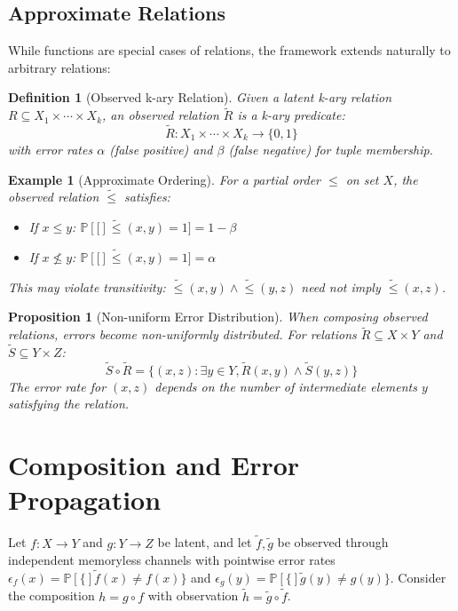 \documentclass[11pt,final,hidelinks]{article}
\newtheorem{proposition}[theorem]{Proposition}
\newtheorem{definition}[theorem]{Definition}
\newtheorem{example}[theorem]{Example}
\newcommand{\obs}[1]{\widetilde{#1}}  %
\newcommand{\Prob}[1]{\mathbb{P}\left[#1\right]}
\newcommand{\error}{\epsilon}
\begin{document}
\subsection{Approximate Relations}

While functions are special cases of relations, the framework extends naturally to arbitrary relations:

\begin{definition}[Observed k-ary Relation]
Given a latent k-ary relation $R \subseteq X_1 \times \cdots \times X_k$, an observed relation $\obs{R}$ is a k-ary predicate:
\begin{equation}
\obs{R}: X_1 \times \cdots \times X_k \to \{0,1\}
\end{equation}
with error rates $\alpha$ (false positive) and $\beta$ (false negative) for tuple membership.
\end{definition}

\begin{example}[Approximate Ordering]
For a partial order $\leq$ on set $X$, the observed relation $\obs{\leq}$ satisfies:
\begin{itemize}
    \item If $x \leq y$: $\Prob[\obs{\leq}(x,y) = 1] = 1 - \beta$
    \item If $x \not\leq y$: $\Prob[\obs{\leq}(x,y) = 1] = \alpha$
\end{itemize}
This may violate transitivity: $\obs{\leq}(x,y) \land \obs{\leq}(y,z)$ need not imply $\obs{\leq}(x,z)$.
\end{example}

\begin{proposition}[Non-uniform Error Distribution]
When composing observed relations, errors become non-uniformly distributed. For relations $\obs{R} \subseteq X \times Y$ and $\obs{S} \subseteq Y \times Z$:
\begin{equation}
\obs{S} \circ \obs{R} = \{(x,z) : \exists y \in Y, \obs{R}(x,y) \land \obs{S}(y,z)\}
\end{equation}
The error rate for $(x,z)$ depends on the number of intermediate elements $y$ satisfying the relation.
\end{proposition}

\section{Composition and Error Propagation}

Let $f:X\to Y$ and $g:Y\to Z$ be latent, and let $\obs{f},\obs{g}$ be observed through independent memoryless channels with pointwise error rates $\error_f(x)=\Prob\{\obs{f}(x)\neq f(x)\}$ and $\error_g(y)=\Prob\{\obs{g}(y)\neq g(y)\}$. Consider the composition $h=g\circ f$ with observation $\obs{h}=\obs{g}\circ\obs{f}$.
\end{document}

